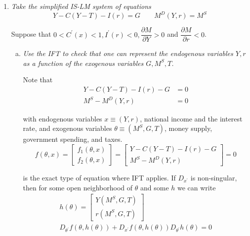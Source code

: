 \documentclass{article}
\begin{document}
\begin{enumerate}[1.]
\begin{enumerate}[a)]
{        which is true by the chain rule.}
    \end{enumerate}

  \item {\itshape
    Take the simplified IS-LM system of equations
    \[
      Y - C(Y - T) - I(r) = G
      \quad\quad
      M^D(Y, r) = M^S
    \]

    Suppose that $0 < C^\prime(x) < 1, I^\prime(r) < 0, \dfrac{\partial M}{\partial Y} > 0$ and $\dfrac{\partial M}{\partial r} < 0$.}
    \begin{enumerate}[a)]
      \item \textit{Use the IFT to check that one can represent the endogenous variables $Y, r$ as a function of the exogenous variables $G, M^S, T$.}

        \solution Note that
          \begin{align*}
            Y - C(Y - T) - I(r) - G & = 0 \\
            M^S - M^D (Y, r)        & = 0
          \end{align*}

          with endogenous variables $x \equiv (Y, r)$, national income and the interest rate, and exogenous variables $\theta \equiv (M^S, G, T)$, money supply, government spending, and taxes.
          \begin{equation}
           \label{eq:is_lm_example}
            f(\theta, x)
            =
            \left[\begin{matrix}
              f_1(\theta, x) \\
              f_2(\theta, x)
            \end{matrix}\right]
            =
            \left[\begin{matrix}
              Y - C(Y - T) - I(r) - G \\
              M^S - M^D (Y, r)
            \end{matrix}\right]
            = 0
          \end{equation}

          is the exact type of equation where IFT applies. If $D_{x^\prime}$ is non-singular, then for some open neighborhood of $\theta$ and some $h$ we can write
          \begin{equation}
            \begin{array}{c}
              h(\theta)
              = \left[\begin{matrix}
                Y(M^S, G, T) \\
                r(M^S, G, T)
              \end{matrix}\right] \\[6pt]
              D_{\theta^\prime} f(\theta, h(\theta)) + D_{x^\prime} f(\theta, h(\theta)) D_{\theta^\prime} h(\theta) = 0
            \end{array}
            \label{eq:ift_example_statement}
          \end{equation}


\end{enumerate}
\end{enumerate}
\end{document}
